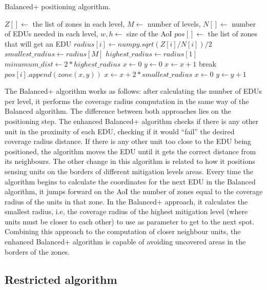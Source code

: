 \begin{refsection}
\begin{algorithm}[ht!]
  \caption{Balanced+ positioning algorithm.}\label{alg:enhanced}
  \begin{algorithmic}
    \REQUIRE $Z[] \gets$ the list of zones in each level, $M \gets$ number of levels, $N[] \gets$ number of EDUs needed in each level, $w, h \gets$ size of the AoI
    \ENSURE $pos[] \gets$ the list of zones that will get an EDU
      \STATE $radius[i] \gets numpy.sqrt(Z[i] / N[i]) / 2$
    \ENDFOR
    \STATE $smallest\_radius \gets radius[M]$
    \STATE $highest\_radius \gets radius[1]$
    \STATE $minumum\_dist \gets 2 * highest\_radius$
    \STATE $x \gets 0$
    \STATE $y \gets 0$
          \STATE $x \gets x + 1$
          \STATE break
        \ENDIF
        \STATE $pos[i].append(zone(x, y))$
        \STATE $x \gets x + 2 * smallest\_radius$
      \ENDWHILE
      \STATE $x \gets 0$
      \STATE $y \gets y + 1$
    \ENDWHILE
  \end{algorithmic}
\end{algorithm}

The Balanced+ algorithm works as follows: after calculating the number of EDUs per level, it performs the coverage radius computation in the same way of the Balanced algorithm. The difference between both approaches lies on the positioning step. The enhanced Balanced+ algorithm checks if there is any other unit in the proximity of each EDU, checking if it would ``fail'' the desired coverage radius distance. If there is any other unit too close to the EDU being positioned, the algorithm moves the EDU until it gets the correct distance from its neighbours. The other change in this algorithm is related to how it positions sensing units on the borders of different mitigation levels areas. Every time the algorithm begins to calculate the coordinates for the next EDU in the Balanced algorithm, it jumps forward on the AoI the number of zones equal to the coverage radius of the units in that zone. In the Balanced+ approach, it calculates the smallest radius, i.e, the coverage radius of the highest mitigation level (where units must be closer to each other) to use as parameter to get to the next spot. Combining this approach to the computation of closer neighbour units, the enhanced Balanced+ algorithm is capable of avoiding uncovered areas in the borders of the zones.

\subsection {Restricted algorithm}


\end{refsection}
